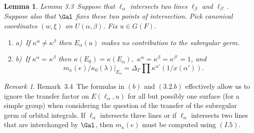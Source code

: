 \documentclass{memo-l}
\newtheorem{lemma}[theorem]{Lemma}
\theoremstyle{definition}
\theoremstyle{remark}
\newtheorem{remark}[theorem]{Remark}
\numberwithin{section}{chapter}
\numberwithin{equation}{chapter}
\begin{document}
{\medskip}

\begin{lemma}{Lemma 3.3}\ Suppose that ${\ell}_{{\alpha}}$
intersects two lines ${\ell}_{{\beta}}$ and ${\ell}_{{\beta}'}$. Suppose also that
$\Gal$ fixes these two points of intersection.  Pick canonical
coordinates $(w,{\xi})$ on $U({\alpha},{\beta})$.  Fix $u  \in  G(F)$.
\begin{enumerate}
\item{a)}\ If ${\kappa}^{{\alpha}} \ne {\kappa}^{{\beta}}$ then $E_{{\alpha}}(u)$
makes no contribution to the subregular germ.
\item{b)}\ If ${\kappa}^{{\alpha}} = {\kappa}^{{\beta}}$ then ${\kappa}(E_{0})  = 
{\kappa}(E_{{\alpha}}),$
${\kappa}^{{\alpha}} ={\kappa}^{{\beta}} = {\kappa}^{{\beta}'} = 1$, and
$$m_{{\kappa}}(e)/{\kappa}_{0}({\lambda})\vert _{E_\alpha}  = 
{\Delta}_{{\Gamma}}\prod{\kappa}^{{\alpha}'}(1/x({\alpha}')).$$
\end{enumerate}
\end{lemma}

\begin{remark}{Remark\ 3.4}\ The formulas in $(b)$ and $(3.2.b)$ effectively
allow us to ignore the transfer factor on $E({\ell}_{{\alpha}},u)$ for all
but possibly one surface (for a simple group) when considering the question
of the transfer of the subregular germ of orbital integrals.  If
${\ell}_{{\alpha}}$ intersects three lines or if ${\ell}_{{\alpha}}$
intersects two lines that are interchanged by $\Gal$, then
$m_{{\kappa}}(e)$ must be computed using $(I.5)$.
\end{remark}
\end{document}
